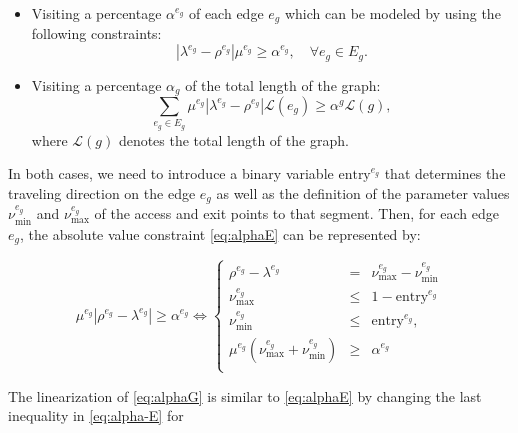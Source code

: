 \begin{itemize}
    \item Visiting a percentage $\alpha^{e_g}$ of each edge $e_g$ which can be modeled by using the following constraints:
    \begin{equation}\label{eq:alphaE}\tag{$\alpha$-E}
    |\lambda^{e_g} - \rho^{e_g}|\mu^{e_g}\geq \alpha^{e_g}, \quad \forall e_g\in E_g.
    \end{equation}
    \item Visiting a percentage $\alpha_g$ of the total length of the graph:
    \begin{equation}\label{eq:alphaG}\tag{$\alpha$-G}
    \sum_{e_g\in E_g} \mu^{e_g}|\lambda^{e_g} - \rho^{e_g}|\mathcal L(e_g) \geq \alpha^g\mathcal L(g),
    \end{equation}
    where $\mathcal L(g)$ denotes the total length of the graph.
\end{itemize}

\bigskip
\noindent
In both cases, we need to introduce a binary variable $\text{entry}^{e_g}$ that determines the traveling direction on the edge $e_g$ as well as the definition of the parameter values $\nu_\text{min}^{e_g}$ and $\nu_\text{max}^{e_g}$ of the access and exit points to that segment. Then, for each edge $e_g$, the absolute value constraint \eqref{eq:alphaE} can be represented by:

\begin{equation}\label{eq:alpha-E}\tag{$\alpha$-E}
 \mu^{e_g}|\rho^{e_g}-\lambda^{e_g}|\geq \alpha^{e_g} \Longleftrightarrow
 \left\{
 \begin{array}{ccl}
  \rho^{e_g} - \lambda^{e_g}                       & =    & \nu_\text{max}^{e_g} - \nu_\text{min}^{e_g}                                     \\
  \nu_\text{max}^{e_g}                         & \leq & 1-{\text{entry}^{e_g}}                                    \\
  \nu_\text{min}^{e_g}                      & \leq & {  \text{entry}^{e_g}},                                        \\
  \mu^{e_g}(\nu_\text{max}^{e_g} + \nu_\text{min}^{e_g} ) & \geq & \alpha^{e_g}
  \\
 \end{array}
 \right.
\end{equation}

\noindent
The linearization of \eqref{eq:alphaG} is similar to \eqref{eq:alphaE} by changing the last inequality in \eqref{eq:alpha-E} for

